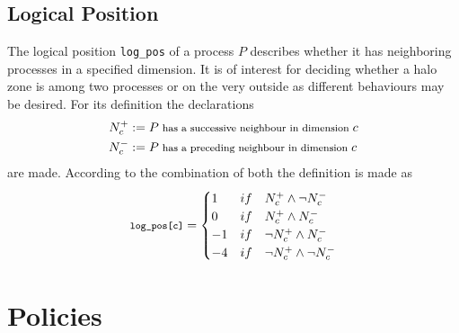\subsection{Logical Position}
The logical position \verb|log_pos| of a process $P$ describes whether it has neighboring processes in a specified dimension. It is of interest for deciding whether a halo zone is among two processes or on the very outside as different behaviours may be desired. For its definition the declarations 
\begin{align}
	N^+_c &:= P\text{\footnotesize{ has a successive neighbour in dimension }} c \nonumber \\
	N^-_c &:= P\text{\footnotesize{ has a preceding neighbour in dimension }} c  \nonumber
\end{align}
are made. According to the combination of both the definition is made as
\begin{equation}
\text{\footnotesize\texttt{log\_pos[c]}} = 
\begin{cases} 
1 & if\quad N^+_c \land \lnot N^-_c  \\
0 & if\quad N^+_c \land  N^-_c  \\
-1 & if\quad \lnot N^+_c \land N^-_c  \\
-4 & if\quad \lnot N^+_c \land \lnot N^-_c  \\
\end{cases}
\end{equation}

\section{Policies}
